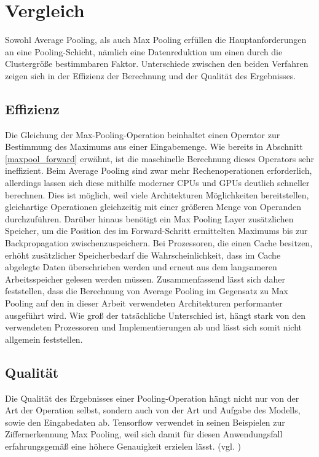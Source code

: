 \documentclass[../main.tex]{subfiles}
\begin{document}
\section{Vergleich}
Sowohl Average Pooling, als auch Max Pooling erfüllen die Hauptanforderungen an eine Pooling-Schicht, nämlich eine Datenreduktion um einen durch die Clustergröße bestimmbaren Faktor. Unterschiede zwischen den beiden Verfahren zeigen sich in der Effizienz der Berechnung und der Qualität des Ergebnisses. 
\subsection{Effizienz}
Die Gleichung der Max-Pooling-Operation beinhaltet einen Operator zur Bestimmung des Maximums aus einer Eingabemenge. Wie bereits in Abschnitt \ref{maxpool_forward} erwähnt, ist die maschinelle Berechnung dieses Operators sehr ineffizient. Beim Average Pooling sind zwar mehr Rechenoperationen erforderlich, allerdings lassen sich diese mithilfe moderner CPUs und GPUs deutlich schneller berechnen. Dies ist möglich, weil viele Architekturen Möglichkeiten bereitstellen, gleichartige Operationen gleichzeitig mit einer größeren Menge von Operanden durchzuführen. 
Darüber hinaus benötigt ein Max Pooling Layer zusätzlichen Speicher, um die Position des im Forward-Schritt ermittelten Maximums bis zur Backpropagation zwischenzuspeichern. Bei Prozessoren, die einen Cache besitzen, erhöht zusätzlicher Speicherbedarf die Wahrscheinlichkeit, dass im Cache abgelegte Daten überschrieben werden und erneut aus dem langsameren Arbeitsspeicher gelesen werden müssen. 
Zusammenfassend lässt sich daher feststellen, dass die Berechnung von Average Pooling im Gegensatz zu Max Pooling auf den in dieser Arbeit verwendeten Architekturen performanter ausgeführt wird. Wie groß der tatsächliche Unterschied ist, hängt stark von den verwendeten Prozessoren und Implementierungen ab und lässt sich somit nicht allgemein feststellen. 
\subsection{Qualität}
Die Qualität des Ergebnisses einer Pooling-Operation hängt nicht nur von der Art der Operation selbst, sondern auch von der Art und Aufgabe des Modells, sowie den Eingabedaten ab. Tensorflow verwendet in seinen Beispielen zur Ziffernerkennung Max Pooling, weil sich damit für diesen Anwendungsfall erfahrungsgemäß eine höhere Genauigkeit erzielen lässt. (vgl. \cite{tensorflowTutorial})
\end{document}

